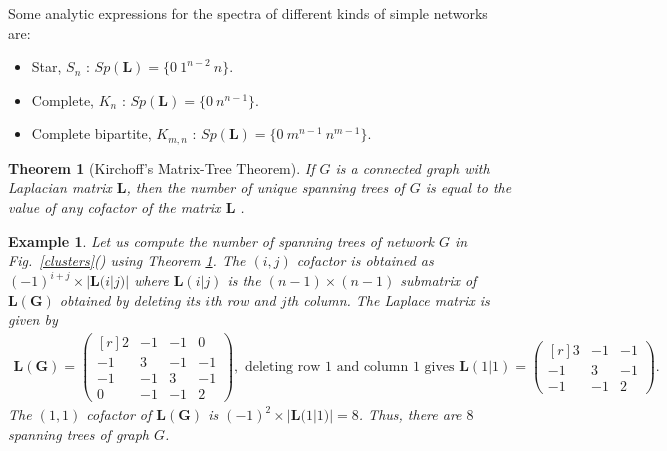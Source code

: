 \documentclass[10pt,a4paper]{article}
\newtheorem{thm}{Theorem}
\newtheorem{exa}{Example}
\begin{document}
Some analytic expressions for the spectra of different kinds of simple networks are:
\begin{itemize}
	\item Star, $S_n$ : $Sp(\mathbf{L}) = \{ 0~ 1^{n-2}~n\}$. 
	
	\item Complete, $K_n$ : $Sp(\mathbf{L}) = \{ 0~ n^{n-1} \}$. 
	
	\item Complete bipartite, $K_{m,n}$ : $Sp(\mathbf{L}) =\{ 0 ~ m^{n-1} ~ n^{m-1}\}$.
	
\end{itemize}

\begin{thm}[Kirchoff's Matrix-Tree Theorem]
	If $G$ is a connected graph with Laplacian matrix $\mathbf{L}$, then the number of unique spanning trees of $G$ is equal to the value of any cofactor of the matrix $\mathbf{L}$ \citep{harris2008combinatorics}.
	\label{thm:kirchoff}
\end{thm}

\begin{exa} Let us compute the number of spanning trees of network $G$ in Fig.~\ref{clusters}() using Theorem \ref{thm:kirchoff}.
	The $(i,j)$ cofactor is obtained as $(-1)^{i+j} \times |\mathbf{L}(i|j)|$ where $\mathbf{L}(i|j)$ is the $(n-1) \times (n-1)$ submatrix of $\mathbf{L(G)}$ obtained by deleting its $i$th row and $j$th column. The Laplace matrix is given by
	\begin{eqnarray*}
		\mathbf{L(G)} = \begin{pmatrix*}[r]
			2 & -1 & -1  & 0 \\
			-1 & 3 & -1 & -1  \\
			-1 & -1 & 3 & -1 \\
			0 & -1 & -1 &  2
		\end{pmatrix*},\text{ deleting row $1$ and column $1$ gives } \mathbf{L}(1|1) = \begin{pmatrix*}[r]
			3 & -1 & -1 \\
			-1 & 3 & -1  \\
			-1 & -1 & 2 
		\end{pmatrix*}.
	\end{eqnarray*}
	The $(1,1)$ cofactor of $\mathbf{L(G)}$ is $ (-1)^2 \times |\mathbf{L}(1|1)| = 8$. Thus, there are $8$ spanning trees of graph $G$.
\end{exa}
\end{document}
